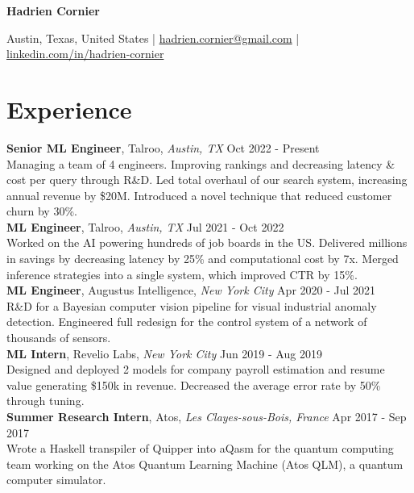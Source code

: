 \documentclass[a4paper,9pt]{article}
\begin{document}
\pagestyle{empty}

\centerline{\huge \textbf{Hadrien Cornier}}

\vspace{2mm}

\centerline{Austin, Texas, United States | \href{mailto:hadrien.cornier@gmail.com}{hadrien.cornier@gmail.com} | \href{https://linkedin.com/in/hadrien-cornier}{linkedin.com/in/hadrien-cornier}}

\vspace{4mm}

\section*{Experience}

\noindent\textbf{Senior ML Engineer}, Talroo, \textit{Austin, TX} \hfill Oct 2022 - Present\\
Managing a team of 4 engineers. Improving rankings and decreasing latency \& cost per query through R\&D. Led total overhaul of our search system, increasing annual revenue by \$20M. Introduced a novel technique that reduced customer churn by 30\%.\\    

\noindent\textbf{ML Engineer}, Talroo, \textit{Austin, TX} \hfill Jul 2021 - Oct 2022\\
    Worked on the AI powering hundreds of job boards in the US. Delivered millions in savings by decreasing latency by 25\% and computational cost by 7x. Merged inference strategies into a single system, which improved CTR by 15\%.\\

    \noindent\textbf{ML Engineer}, Augustus Intelligence, \textit{New York City} \hfill Apr 2020 - Jul 2021\\
    R\&D for a Bayesian computer vision pipeline for visual industrial anomaly detection. Engineered full redesign for the control system of a network of thousands of sensors.\\

    \noindent\textbf{ML Intern}, Revelio Labs, \textit{New York City} \hfill Jun 2019 - Aug 2019\\
    Designed and deployed 2 models for company payroll estimation and resume value generating \$150k in revenue. Decreased the average error rate by 50\% through tuning.\\

    \noindent\textbf{Summer Research Intern}, Atos, \textit{Les Clayes-sous-Bois, France} \hfill Apr 2017 - Sep 2017\\
    Wrote a Haskell transpiler of Quipper into aQasm for the quantum computing team working on the Atos Quantum Learning Machine (Atos QLM), a quantum computer simulator.\\
\end{document}
